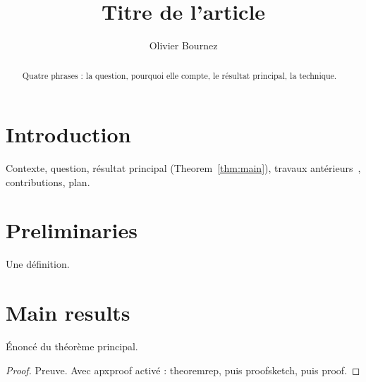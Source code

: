 \documentclass[runningheads]{llncs}
\begin{document}
\title{Titre de l'article}
\author{Olivier Bournez}
\maketitle

\begin{abstract}
Quatre phrases : la question, pourquoi elle compte, le résultat principal, la technique.
\end{abstract}

\section{Introduction}
\label{sec:intro}

Contexte, question, résultat principal (Theorem~\ref{thm:main}), travaux
antérieurs~\cite{JournalACM2017}, contributions, plan.

\section{Preliminaries}
\label{sec:prelim}

\begin{definition}[Notion]
\label{def:notion}
Une définition.
\end{definition}

\section{Main results}
\label{sec:results}

\begin{theorem}
\label{thm:main}
Énoncé du théorème principal.
\end{theorem}
\begin{proof}
Preuve. Avec apxproof activé : theoremrep, puis proofsketch, puis proof.
\end{proof}
\end{document}
